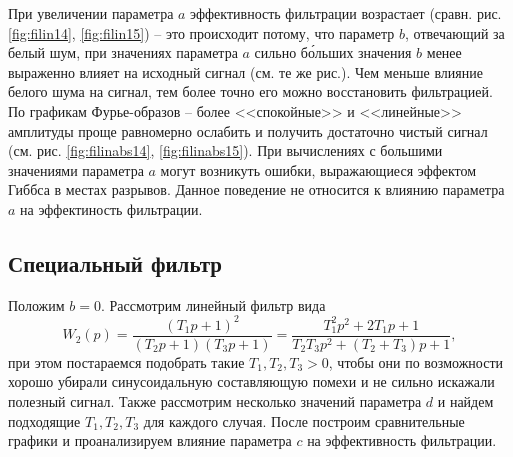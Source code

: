 \documentclass[a4paper, 12pt]{article}
\begin{document}
    
    При увеличении параметра $a$ эффективность фильтрации возрастает (сравн. рис. \ref{fig:filin14}, \ref{fig:filin15}) -- это происходит потому,
    что параметр $b$, отвечающий за белый шум, при значениях параметра $a$ сильно б\'{о}льших значения $b$ менее выраженно влияет на исходный сигнал
    (см. те же рис.). Чем меньше влияние белого шума на сигнал, тем более точно его можно восстановить фильтрацией. По графикам Фурье-образов -- более <<спокойные>> и <<линейные>> амплитуды 
    проще равномерно ослабить и получить достаточно чистый сигнал (см. рис. \ref{fig:filinabs14}, \ref{fig:filinabs15}). При вычислениях с большими
    значениями параметра $a$ могут возникуть ошибки, выражающиеся эффектом Гиббса в местах разрывов. Данное поведение не относится к влиянию параметра
    $a$ на эффектиность фильтрации.


    \subsection{Специальный фильтр}
    Положим $b=0$. Рассмотрим линейный фильтр вида
    $$W_2(p)=\dfrac{\left(T_1p+1\right)^{2}}{\left(T_2p+1\right)\left(T_3p+1\right)}=\dfrac{T_1^2p^2+2T_1p+1}{T_2T_3p^2+\left(T_2+T_3\right)p+1},$$
    при этом постараемся подобрать такие $T_1,T_2,T_3>0$, чтобы они по возможности хорошо убирали синусоидальную составляющую помехи и не сильно искажали
    полезный сигнал. Также рассмотрим несколько значений параметра $d$ и найдем подходящие $T_1,T_2,T_3$ для каждого случая. После построим сравнительные
    графики и проанализируем влияние параметра $c$ на эффективность фильтрации.
\end{document}
